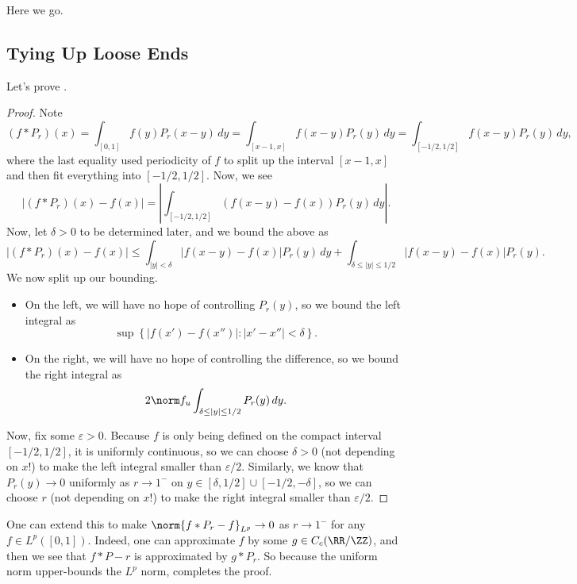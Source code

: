 \documentclass[../notes.tex]{subfiles}
\begin{document}
Here we go.

\subsection{Tying Up Loose Ends}
Let's prove .
\almostdirichletkernellem*
\begin{proof}
	Note
	\[(f*P_r)(x)=\int_{[0,1]}f(y)P_r(x-y)\,dy=\int_{[x-1,x]}f(x-y)P_r(y)\,dy=\int_{[-1/2,1/2]}f(x-y)P_r(y)\,dy,\]
	where the last equality used periodicity of $f$ to split up the interval $[x-1,x]$ and then fit everything into $[-1/2,1/2]$. Now, we see
	\[\left|(f*P_r)(x)-f(x)\right|=\left|\int_{[-1/2,1/2]}(f(x-y)-f(x))P_r(y)\,dy\right|.\]
	Now, let $\delta>0$ to be determined later, and we bound the above as
	\[\left|(f*P_r)(x)-f(x)\right|\le\int_{\left|y\right|<\delta}\left|f(x-y)-f(x)\right|P_r(y)\,dy+\int_{\delta\le\left|y\right|\le1/2}\left|f(x-y)-f(x)\right|P_r(y).\]
	We now split up our bounding.
	\begin{itemize}
		\item On the left, we will have no hope of controlling $P_r(y)$, so we bound the left integral as
		\[\sup\left\{\left|f(x')-f(x'')\right|:\left|x'-x''\right|<\delta\right\}.\]
		\item On the right, we will have no hope of controlling the difference, so we bound the right integral as
		\[2\norm f_u\int_{\delta\le\left|y\right|\le1/2}P_r(y)\,dy.\]
	\end{itemize}
	Now, fix some $\varepsilon>0$. Because $f$ is only being defined on the compact interval $[-1/2,1/2]$, it is uniformly continuous, so we can choose $\delta>0$ (not depending on $x$!) to make the left integral smaller than $\varepsilon/2$. Similarly, we know that $P_r(y)\to0$ uniformly as $r\to1^-$ on $y\in[\delta,1/2]\cup[-1/2,-\delta]$, so we can choose $r$ (not depending on $x$!) to make the right integral smaller than $\varepsilon/2$.
\end{proof}
\begin{remark}
	One can extend this to make $\norm{f*P_r-f}_{L^p}\to0$ as $r\to1^-$ for any $f\in L^p([0,1])$. Indeed, one can approximate $f$ by some $g\in C_c(\RR/\ZZ)$, and then we see that $f*P-r$ is approximated by $g*P_r$. So because the uniform norm upper-bounds the $L^p$ norm,  completes the proof.
\end{remark}
\end{document}
